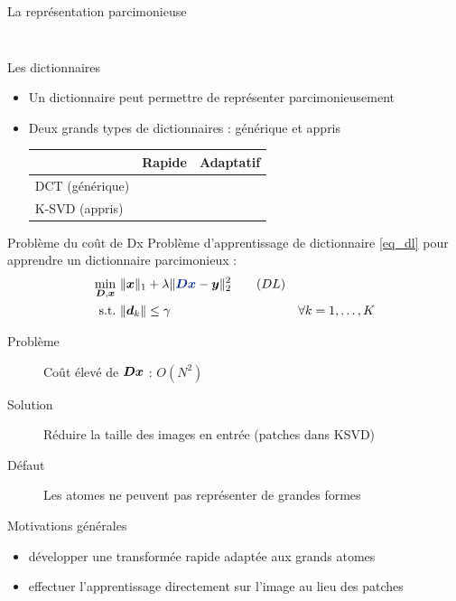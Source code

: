 \begin{frame}{La représentation parcimonieuse}
\begin{itemize}
\begin{columns}
\begin{column}{0.30\textwidth}
\begin{figure}
	\end{figure} \end{column}
	\end{columns}
\end{itemize}
\end{frame}


\begin{frame}{Les dictionnaires}
\begin{itemize}
\item Un dictionnaire peut permettre de représenter parcimonieusement
\item Deux grands types de dictionnaires : générique et appris
	\begin{table}[] \centering
	\begin{tabular}{@{}lcc@{}} \toprule
	 & Rapide & Adaptatif \\ \midrule
	DCT (générique) & \Geq{\cmark} & \Req{\xmark}\\
	K-SVD (appris) & \Req{\xmark} & \Geq{\cmark} \\ \bottomrule
	\end{tabular}
	\end{table}
\end{itemize}
\end{frame}



\begin{frame}{Problème du coût de Dx}
Problème d'apprentissage de dictionnaire \eqref{eq_dl} pour apprendre un dictionnaire parcimonieux :
\begin{align} 
\underset{\D,\x}{\min}~ & \| \x \|_1 + \lambda \| \Beq{\D\x}-\y \|^2_2 \tag{$DL$}\label{eq_dl} \\
\text{s.t.}~ & \| \d_k \| \le \gamma & \forall k = 1,\dots,K\label{eq_dl_finite_norm} \notag
\end{align}
\begin{description}
	\item[Problème] Coût élevé de $\bm{D}\bm{x}$ : $O(N^2)$
	\item[Solution] Réduire la taille des images en entrée (patches dans KSVD)
	\item[Défaut] Les atomes ne peuvent pas représenter de grandes formes
\end{description}
\end{frame}


\begin{frame}{Motivations générales}
	\begin{itemize}
		\item développer une \alert{transformée rapide} adaptée aux grands atomes
		\item effectuer l'apprentissage \alert{directement sur l'image} au lieu des patches
	\end{itemize}
\end{frame}







